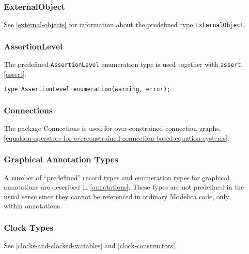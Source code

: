 \subsubsection{ExternalObject}

See \autoref{external-objects} for information about the predefined type
\lstinline!ExternalObject!.

\subsubsection{AssertionLevel}

The predefined \lstinline!AssertionLevel! enumeration type is used together with
\lstinline!assert!, \autoref{assert}.
\begin{lstlisting}[language=modelica]
type AssertionLevel=enumeration(warning, error);
\end{lstlisting}

\subsubsection{Connections}

The package Connections is used for over-constrained connection graphs,
\autoref{equation-operators-for-overconstrained-connection-based-equation-systems}.

\subsubsection{Graphical Annotation Types}

A number of ``predefined'' record types and enumeration types for
graphical annotations are described in \autoref{annotations}. These types are not
predefined in the usual sense since they cannot be referenced in
ordinary Modelica code, only within annotations.

\subsubsection{Clock Types}

See \autoref{clocks-and-clocked-variables} and \autoref{clock-constructors}.
